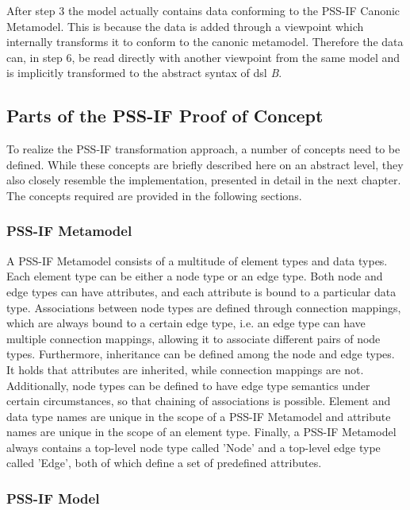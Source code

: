 After step 3 the model actually contains data conforming to the PSS-IF Canonic Metamodel. This is because the data is added through a viewpoint which internally transforms it to conform to the canonic metamodel. Therefore the data can, in step 6, be read directly with another viewpoint from the same model and is implicitly transformed to the abstract syntax of \gls{dsl} \textit{B}.

\subsection{Parts of the PSS-IF Proof of Concept}

To realize the PSS-IF transformation approach, a number of concepts need to be defined. While these concepts are briefly described here on an abstract level, they also closely resemble the implementation, presented in detail in the next chapter. The concepts required are provided in the following sections.

\subsubsection{PSS-IF Metamodel}

A PSS-IF Metamodel consists of a multitude of element types and data types. Each element type can be either a node type or an edge type. Both node and edge types can have attributes, and each attribute is bound to a particular data type. Associations between node types are defined through connection mappings, which are always bound to a certain edge type, i.e. an edge type can have multiple connection mappings, allowing it to associate different pairs of node types. Furthermore, inheritance can be defined among the node and edge types. It holds that attributes are inherited, while connection mappings are not. Additionally, node types can be defined to have edge type semantics under certain circumstances, so that chaining of associations is possible. Element and data type names are unique in the scope of a PSS-IF Metamodel and attribute names are unique in the scope of an element type. Finally, a PSS-IF Metamodel always contains a top-level node type called 'Node' and a top-level edge type called 'Edge', both of which define a set of predefined attributes.

\subsubsection{PSS-IF Model}

